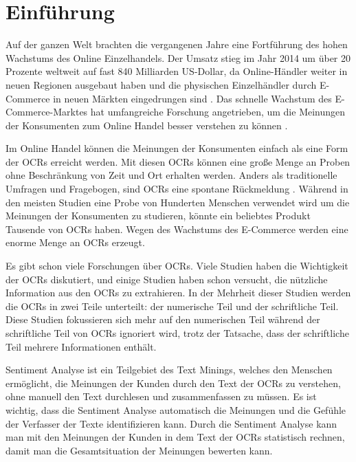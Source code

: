 \chapter{Einführung}
Auf der ganzen Welt brachten die vergangenen Jahre eine Fortführung des hohen Wachstums des Online Einzelhandels. Der Umsatz stieg im Jahr 2014 um über 20 Prozente weltweit auf fast 840 Milliarden US-Dollar, da Online-Händler weiter in neuen Regionen ausgebaut haben und die physischen Einzelhändler durch E-Commerce in neuen Märkten eingedrungen sind \citep{HanaBen-Shabat2015}. Das schnelle Wachstum des E-Commerce-Marktes hat umfangreiche Forschung angetrieben, um die Meinungen der Konsumenten zum Online Handel besser verstehen zu können \citep{tong2010cross}.

Im Online Handel können die Meinungen der Konsumenten einfach als eine Form der \ac{OCRs} erreicht werden. Mit diesen \ac{OCRs} können eine große Menge an Proben ohne Beschränkung von Zeit und Ort erhalten werden. Anders als traditionelle Umfragen und Fragebogen, sind \ac{OCRs} eine spontane Rückmeldung \citep{lu2015understanding}. Während in den meisten Studien eine Probe von Hunderten Menschen verwendet wird um die Meinungen der Konsumenten zu studieren, könnte ein beliebtes Produkt Tausende von \ac{OCRs} haben. Wegen des Wachstums des E-Commerce werden eine enorme Menge an \ac{OCRs} erzeugt.

Es gibt schon viele Forschungen über \ac{OCRs}. Viele Studien haben die Wichtigkeit der \ac{OCRs} diskutiert, und einige Studien haben schon versucht, die nützliche Information aus den \ac{OCRs} zu extrahieren. In der Mehrheit dieser Studien werden die \ac{OCRs} in zwei Teile unterteilt: der numerische Teil und der schriftliche Teil. Diese Studien fokussieren sich mehr auf den numerischen Teil während der schriftliche Teil von \ac{OCRs} ignoriert wird, trotz der Tatsache, dass der schriftliche Teil mehrere Informationen enthält.

Sentiment Analyse ist ein Teilgebiet des Text Minings, welches den Menschen ermöglicht, die Meinungen der Kunden durch den Text der \ac{OCRs} zu verstehen, ohne manuell den Text durchlesen und zusammenfassen zu müssen. Es ist wichtig, dass die Sentiment Analyse automatisch die Meinungen und die Gefühle der Verfasser der Texte identifizieren kann. Durch die Sentiment Analyse kann man mit den Meinungen der Kunden in dem Text der \ac{OCRs} statistisch rechnen, damit man die Gesamtsituation der Meinungen bewerten kann.

